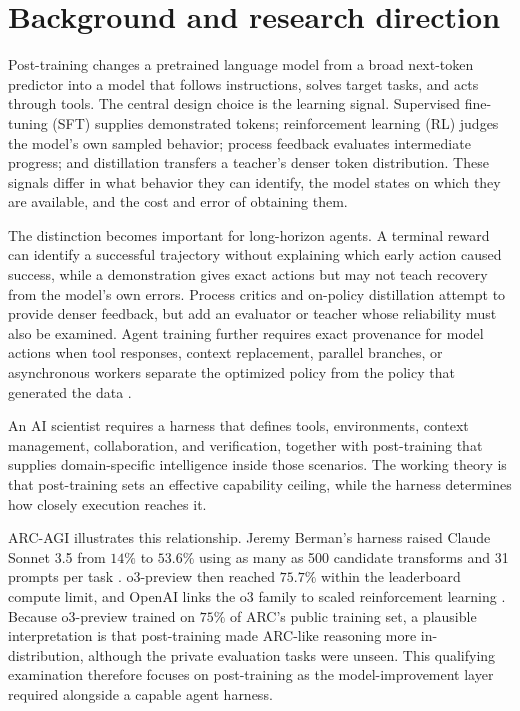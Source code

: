 \section{Background and research direction}

Post-training changes a pretrained language model from a broad next-token predictor into
a model that follows instructions, solves target tasks, and acts through tools. The central
design choice is the learning signal. Supervised fine-tuning (SFT) supplies demonstrated
tokens; reinforcement learning (RL) judges the model's own sampled behavior; process
feedback evaluates intermediate progress; and distillation transfers a teacher's denser
token distribution. These signals differ in what behavior they can identify, the model
states on which they are available, and the cost and error of obtaining them.

The distinction becomes important for long-horizon agents. A terminal reward can identify
a successful trajectory without explaining which early action caused success, while a
demonstration gives exact actions but may not teach recovery from the model's own errors.
Process critics and on-policy distillation attempt to provide denser feedback, but add an
evaluator or teacher whose reliability must also be examined. Agent training further
requires exact provenance for model actions when tool responses, context replacement,
parallel branches, or asynchronous workers separate the optimized policy from the policy
that generated the data \citep{lightman2023verify,xu2026polar,glm5team2026}.

An AI scientist requires a harness that defines tools, environments, context management,
collaboration, and verification, together with post-training that supplies domain-specific
intelligence inside those scenarios. The working theory is that post-training sets an
effective capability ceiling, while the harness determines how closely execution reaches
it.

ARC-AGI illustrates this relationship. Jeremy Berman's harness raised Claude Sonnet 3.5
from $14\%$ to $53.6\%$ using as many as 500 candidate transforms and 31 prompts per task
\citep{kamradt2024arcprogress}. o3-preview then reached $75.7\%$ within the leaderboard
compute limit, and OpenAI links the o3 family to scaled reinforcement learning
\citep{chollet2024o3arc,openai2025o3}. Because o3-preview trained on $75\%$ of ARC's public
training set, a plausible interpretation is that post-training made ARC-like reasoning
more in-distribution, although the private evaluation tasks were unseen. This qualifying
examination therefore focuses on post-training as the model-improvement layer required
alongside a capable agent harness.

